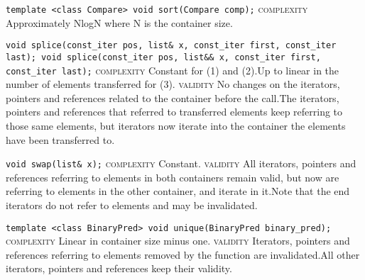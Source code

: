 \noindent{}\hspace*{0.25em}\lstinline[basicstyle=\ttfamily\color{cred}]{template <class Compare> void sort(Compare comp);} \textsc{complexity} Approximately NlogN where N is the container size.\\\vspace{-0.6em}

\noindent{}\hspace*{0.25em}\lstinline[basicstyle=\ttfamily\color{corange}]{void splice(const_iter pos, list& x, const_iter first, const_iter last); void splice(const_iter pos, list&& x, const_iter first, const_iter last);} \textsc{complexity} Constant for (1) and (2).Up to linear in the number of elements transferred for (3). \textsc{validity} No changes on the iterators, pointers and references related to the container before the call.The iterators, pointers and references that referred to transferred elements keep referring to those same elements, but iterators now iterate into the container the elements have been transferred to.\\\vspace{-0.6em}

\noindent{}\hspace*{0.25em}\lstinline[basicstyle=\ttfamily\color{cgreen}]{void swap(list& x);} \textsc{complexity} Constant. \textsc{validity} All iterators, pointers and references referring to elements in both containers remain valid, but now are referring to elements in the other container, and iterate in it.Note that the end iterators do not refer to elements and may be invalidated.\\\vspace{-0.6em}

\noindent{}\hspace*{0.25em}\lstinline[basicstyle=\ttfamily\color{corange}]{template <class BinaryPred> void unique(BinaryPred binary_pred);} \textsc{complexity} Linear in container size minus one. \textsc{validity} Iterators, pointers and references referring to elements removed by the function are invalidated.All other iterators, pointers and references keep their validity.\\\vspace{-0.6em}


